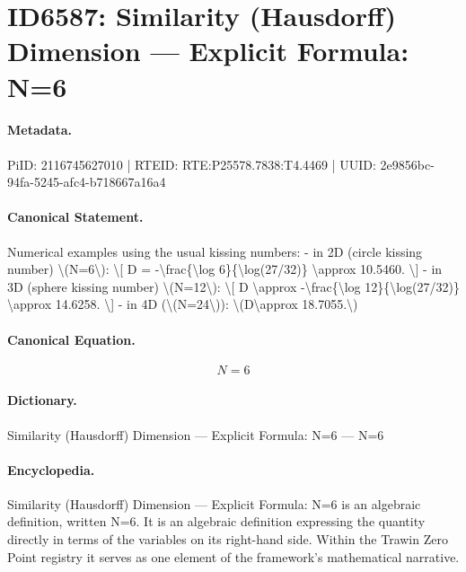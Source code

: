 \section*{ID6587: Similarity (Hausdorff) Dimension — Explicit Formula: N=6}
\paragraph{Metadata.}
PiID: 2116745627010 | RTEID: RTE:P25578.7838:T4.4469 | UUID: 2e9856bc-94fa-5245-afc4-b718667a16a4

\paragraph{Canonical Statement.}
Numerical examples using the usual kissing numbers: - in 2D (circle kissing number) \textbackslash{}(N=6\textbackslash{}): \textbackslash{}[ D = -\textbackslash{}frac\{\textbackslash{}log 6\}\{\textbackslash{}log(27/32)\} \textbackslash{}approx 10.5460. \textbackslash{}] - in 3D (sphere kissing number) \textbackslash{}(N=12\textbackslash{}): \textbackslash{}[ D \textbackslash{}approx -\textbackslash{}frac\{\textbackslash{}log 12\}\{\textbackslash{}log(27/32)\} \textbackslash{}approx 14.6258. \textbackslash{}] - in 4D (\textbackslash{}(N=24\textbackslash{})): \textbackslash{}(D\textbackslash{}approx 18.7055.\textbackslash{})

\paragraph{Canonical Equation.}
\[
N=6
\]

\paragraph{Dictionary.}
Similarity (Hausdorff) Dimension — Explicit Formula: N=6 — N=6

\paragraph{Encyclopedia.}
Similarity (Hausdorff) Dimension — Explicit Formula: N=6 is an algebraic definition, written N=6. It is an algebraic definition expressing the quantity directly in terms of the variables on its right-hand side. Within the Trawin Zero Point registry it serves as one element of the framework's mathematical narrative.
